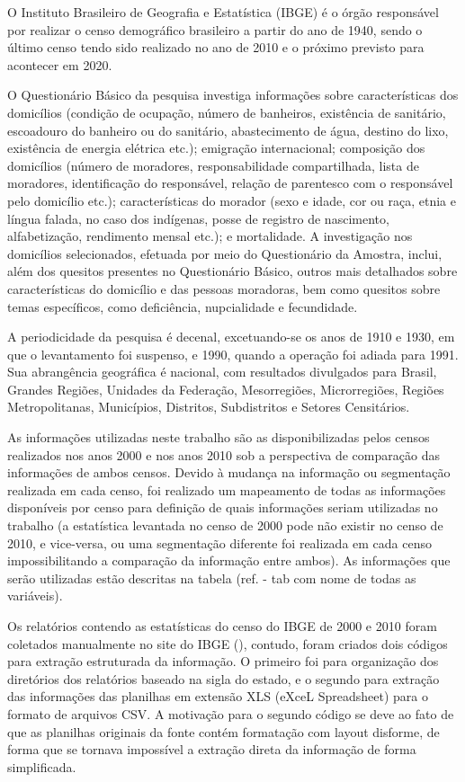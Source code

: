 O Instituto Brasileiro de Geografia e Estatística (IBGE) é o órgão responsável por realizar o censo demográfico brasileiro a partir do ano de 1940, sendo o último censo tendo sido realizado no ano de 2010 e o próximo previsto para acontecer em 2020.

O Questionário Básico da pesquisa investiga informações sobre características dos domicílios (condição de ocupação, número de banheiros, existência de sanitário, escoadouro do banheiro ou do sanitário, abastecimento de água, destino do lixo, existência de energia elétrica etc.); emigração internacional; composição dos domicílios (número de moradores, responsabilidade compartilhada, lista de moradores, identificação do responsável, relação de parentesco com o responsável pelo domicílio etc.); características do morador (sexo e idade, cor ou raça, etnia e língua falada, no caso dos indígenas, posse de registro de nascimento, alfabetização, rendimento mensal etc.); e mortalidade. A investigação nos domicílios selecionados, efetuada por meio do Questionário da Amostra, inclui, além dos quesitos presentes no Questionário Básico, outros mais detalhados sobre características do domicílio e das pessoas moradoras, bem como quesitos sobre temas específicos, como deficiência, nupcialidade e fecundidade.

A periodicidade da pesquisa é decenal, excetuando-se os anos de 1910 e 1930, em que o levantamento foi suspenso, e 1990, quando a operação foi adiada para 1991. Sua abrangência geográfica é nacional, com resultados divulgados para Brasil, Grandes Regiões, Unidades da Federação, Mesorregiões, Microrregiões, Regiões Metropolitanas, Municípios, Distritos, Subdistritos e Setores Censitários.

As informações utilizadas neste trabalho são as disponibilizadas pelos censos realizados nos anos 2000 e nos anos 2010 sob a perspectiva de comparação das informações de ambos censos. Devido à mudança na informação ou segmentação realizada em cada censo, foi realizado um mapeamento de todas as informações disponíveis por censo para definição de quais informações seriam utilizadas no trabalho (a estatística levantada no censo de 2000 pode não existir no censo de 2010, e vice-versa, ou uma segmentação diferente foi realizada em cada censo impossibilitando a comparação da informação entre ambos). As informações que serão utilizadas estão descritas na tabela (ref. - tab com nome de todas as variáveis).

Os relatórios contendo as estatísticas do censo do IBGE de 2000 e 2010 foram coletados manualmente no site do IBGE (\citet{IBGE}), contudo, foram criados dois códigos para extração estruturada da informação. O primeiro foi para organização dos diretórios dos relatórios baseado na sigla do estado, e o segundo para extração das informações das planilhas em extensão XLS (eXceL Spreadsheet) para o formato de arquivos CSV. A motivação para o segundo código se deve ao fato de que as planilhas originais da fonte contém formatação com layout disforme, de forma que se tornava impossível a extração direta da informação de forma simplificada.

